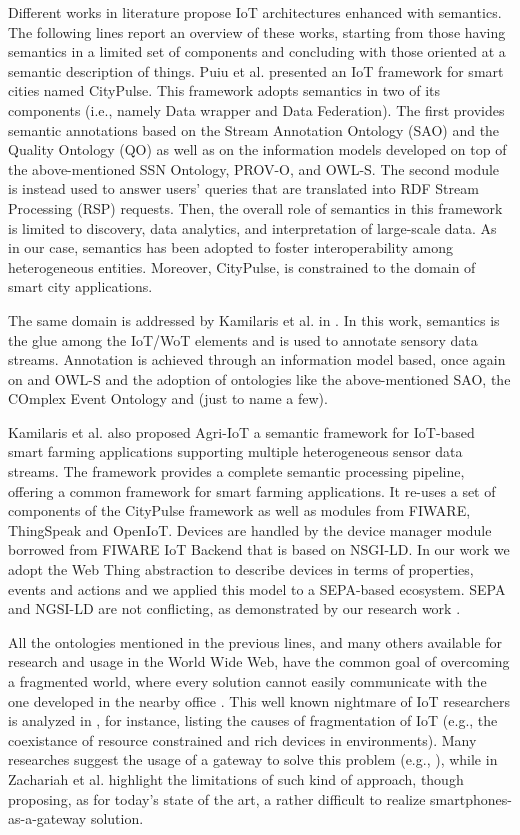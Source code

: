 Different works in literature propose IoT architectures enhanced with semantics. The following lines report an overview of these works, starting from those having semantics in a limited set of components and concluding with those oriented at a semantic description of things. 
Puiu et al. \cite{puiu2016citypulse} presented an IoT framework for smart cities named CityPulse. This framework adopts semantics in two of its components (i.e., namely Data wrapper and Data Federation). The first provides semantic annotations based on the Stream Annotation Ontology (SAO) and the Quality Ontology (QO) as well as on the information models developed on top of the above-mentioned SSN Ontology, PROV-O, and OWL-S. The second module is instead used to answer users' queries that are translated into RDF Stream Processing (RSP) requests. Then, the overall role of semantics in this framework is limited to discovery, data analytics, and interpretation of large-scale data. As in our case, semantics has been adopted to foster interoperability among heterogeneous entities. Moreover, CityPulse, is constrained to the domain of smart city applications.

The same domain is addressed by Kamilaris et al. in \cite{kamilaris2017web}. In this work, semantics is the glue among the IoT/WoT elements and is used to annotate sensory data streams. Annotation is achieved through an information model based, once again on  and OWL-S and the adoption of ontologies like the above-mentioned SAO, the COmplex Event Ontology and  (just to name a few).

Kamilaris et al. also proposed Agri-IoT \cite{kamilaris2016agri} a semantic framework for IoT-based smart farming applications supporting multiple heterogeneous sensor data streams. The framework provides a complete semantic processing pipeline, offering a common framework for smart farming applications. It re-uses a set of components of the CityPulse framework \cite{puiu2016citypulse} as well as modules from FIWARE, ThingSpeak and OpenIoT.  Devices are handled by the device manager module borrowed from FIWARE IoT Backend that is based on NSGI-LD. In our work we adopt the Web Thing abstraction to describe devices in terms of properties, events and actions and we applied this model to a SEPA-based ecosystem. SEPA and NGSI-LD are not conflicting, as demonstrated by our research work \cite{viola2019fiware}.

All the ontologies mentioned in the previous lines, and many others available for research and usage in the World Wide Web, have the common goal of overcoming a fragmented world, where every solution cannot easily communicate with the one developed in the nearby office \cite{tommasini2016towards}. This well known nightmare of IoT researchers is analyzed in \cite{al2015toward}, for instance, listing the causes of fragmentation of IoT (e.g., the coexistance of resource constrained and rich devices in environments). Many researches suggest the usage of a gateway to solve this problem (e.g., \cite{zhu2010iot, datta2014iot}), while in \cite{zachariah2015internet} Zachariah et al. highlight the limitations of such kind of approach, though proposing, as for today's state of the art, a rather difficult to realize smartphones-as-a-gateway solution. 


